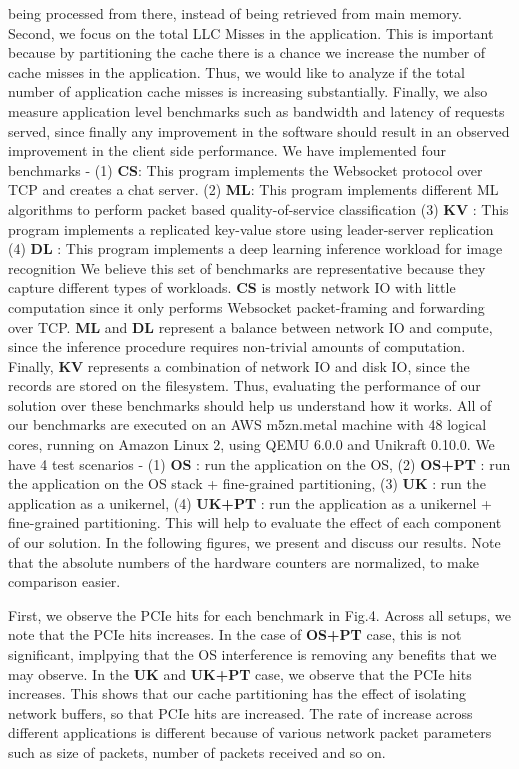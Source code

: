 \documentclass[sigconf,authorversion,noacm]{acmart}
\begin{document}
being processed from there, instead of being retrieved from main memory. Second,
we focus on the total LLC Misses in the application. This is important because
by partitioning the cache there is a chance we increase the number of cache
misses in the application. Thus, we would like to analyze if the total number of
application cache misses is increasing substantially. Finally, we also measure
application level benchmarks such as bandwidth and latency of requests served,
since finally any improvement in the software should result in an observed
improvement in the client side performance. We have implemented four benchmarks
- (1) \textbf{CS}: This program implements the Websocket protocol over TCP and
creates a chat server. (2) \textbf{ML}: This program implements different ML
algorithms to perform packet based quality-of-service classification (3)
\textbf{KV} : This program implements a replicated key-value store using
leader-server replication (4) \textbf{DL} : This program implements a deep
learning inference workload for image recognition We believe this set of
benchmarks are representative because they capture different types of workloads.
\textbf{CS} is mostly network IO with little computation since it only performs
Websocket packet-framing and forwarding over TCP. \textbf{ML} and \textbf{DL}
represent a balance between network IO and compute, since the inference
procedure requires non-trivial amounts of computation. Finally, \textbf{KV}
represents a combination of network IO and disk IO, since the records are stored
on the filesystem. Thus, evaluating the performance of our solution over these
benchmarks should help us understand how it works. All of our benchmarks are
executed on an AWS m5zn.metal machine with 48 logical cores, running on Amazon
Linux 2, using QEMU 6.0.0 and Unikraft 0.10.0. We have 4 test scenarios - (1)
\textbf{OS} : run the application on the OS, (2) \textbf{OS+PT} : run the
application on the OS stack + fine-grained partitioning, (3) \textbf{UK} : run
the application as a unikernel, (4) \textbf{UK+PT} : run the application as a
unikernel + fine-grained partitioning. This will help to evaluate the effect of
each component of our solution. In the following figures, we present and discuss
our results. Note that the absolute numbers of the hardware counters are
normalized, to make comparison easier. 

First, we observe the PCIe hits for each benchmark in Fig.4. Across all setups,
we note that the PCIe hits increases. In the case of \textbf{OS+PT} case, this
is not significant, implpying that the OS interference is removing any benefits
that we may observe. In the \textbf{UK} and \textbf{UK+PT} case, we observe that
the PCIe hits increases. This shows that our cache partitioning has the effect
of isolating network buffers, so that PCIe hits are increased. The rate of
increase across different applications is different because of various network
packet parameters such as size of packets, number of packets received and so on.
\end{document}
